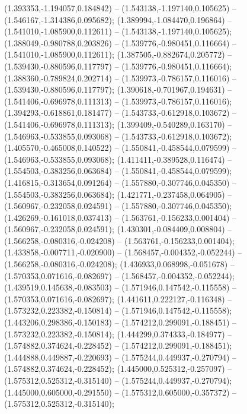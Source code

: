  (1.393353,-1.194057,0.184842) -- (1.543138,-1.197140,0.105625) -- (1.546167,-1.314386,0.095682);
 (1.389994,-1.084470,0.196864) -- (1.541010,-1.085900,0.112611) -- (1.543138,-1.197140,0.105625);
 (1.388049,-0.980788,0.203826) -- (1.539776,-0.980451,0.116664) -- (1.541010,-1.085900,0.112611);
 (1.387505,-0.882674,0.205772) -- (1.539430,-0.880596,0.117797) -- (1.539776,-0.980451,0.116664);
 (1.388360,-0.789824,0.202714) -- (1.539973,-0.786157,0.116016) -- (1.539430,-0.880596,0.117797);
 (1.390618,-0.701967,0.194631) -- (1.541406,-0.696978,0.111313) -- (1.539973,-0.786157,0.116016);
 (1.394293,-0.618861,0.181477) -- (1.543733,-0.612918,0.103672) -- (1.541406,-0.696978,0.111313);
 (1.399409,-0.540289,0.163170) -- (1.546963,-0.533855,0.093068) -- (1.543733,-0.612918,0.103672);
 (1.405570,-0.465008,0.140522) -- (1.550841,-0.458544,0.079599) -- (1.546963,-0.533855,0.093068);
 (1.411411,-0.389528,0.116474) -- (1.554503,-0.383256,0.063684) -- (1.550841,-0.458544,0.079599);
 (1.416815,-0.313654,0.091264) -- (1.557880,-0.307746,0.045350) -- (1.554503,-0.383256,0.063684);
 (1.421771,-0.237458,0.064905) -- (1.560967,-0.232058,0.024591) -- (1.557880,-0.307746,0.045350);
 (1.426269,-0.161018,0.037413) -- (1.563761,-0.156233,0.001404) -- (1.560967,-0.232058,0.024591);
 (1.430301,-0.084409,0.008804) -- (1.566258,-0.080316,-0.024208) -- (1.563761,-0.156233,0.001404);
 (1.433858,-0.007711,-0.020900) -- (1.568457,-0.004352,-0.052244) -- (1.566258,-0.080316,-0.024208);
 (1.436933,0.068998,-0.051678) -- (1.570353,0.071616,-0.082697) -- (1.568457,-0.004352,-0.052244);
 (1.439519,0.145638,-0.083503) -- (1.571946,0.147542,-0.115558) -- (1.570353,0.071616,-0.082697);
 (1.441611,0.222127,-0.116348) -- (1.573232,0.223382,-0.150814) -- (1.571946,0.147542,-0.115558);
 (1.443206,0.298386,-0.150183) -- (1.574212,0.299091,-0.188451) -- (1.573232,0.223382,-0.150814);
 (1.444299,0.374333,-0.184977) -- (1.574882,0.374624,-0.228452) -- (1.574212,0.299091,-0.188451);
 (1.444888,0.449887,-0.220693) -- (1.575244,0.449937,-0.270794) -- (1.574882,0.374624,-0.228452);
 (1.445000,0.525312,-0.257097) -- (1.575312,0.525312,-0.315140) -- (1.575244,0.449937,-0.270794);
 (1.445000,0.605000,-0.291550) -- (1.575312,0.605000,-0.357372) -- (1.575312,0.525312,-0.315140);
